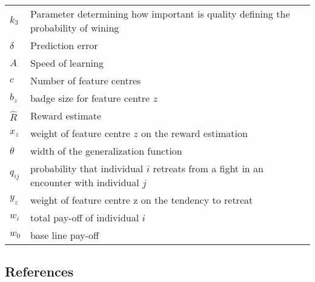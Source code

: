\documentclass[
  12pt,
]{article}
\begin{document}
\begin{longtable}[]{@{}
  >{\centering\arraybackslash}p{}
  >{\raggedright\arraybackslash}p{}@{}}
\(k_3\) & Parameter determining how important is quality defining the
probability of wining \\
\(\delta\) & Prediction error \\
\(A\) & Speed of learning \\
\(c\) & Number of feature centres \\
\(b_z\) & badge size for feature centre \(z\) \\
\(\hat{R}\) & Reward estimate \\
\(x_z\) & weight of feature centre \(z\) on the reward estimation \\
\(\theta\) & width of the generalization function \\
\(q_{ij}\) & probability that individual \(i\) retreats from a fight in
an encounter with individual \(j\) \\
\(y_z\) & weight of feature centre z on the tendency to retreat \\
\(w_i\) & total pay-off of individual \(i\) \\
\(w_0\) & base line pay-off \\
\end{longtable}

\hypertarget{references}{%
\subsection*{References}\label{references}}
\end{document}
